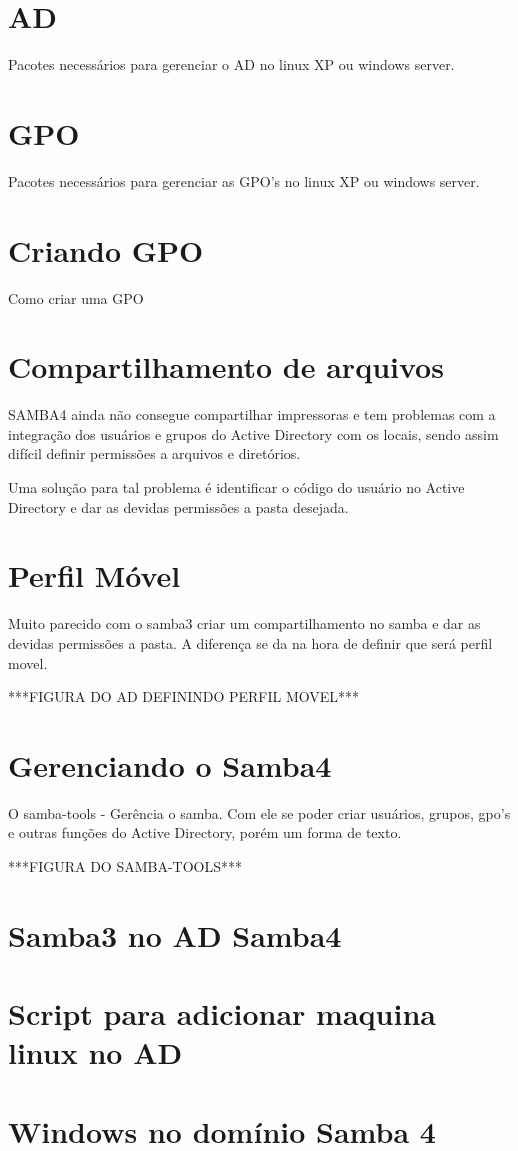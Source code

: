 \section{AD}

Pacotes necessários para gerenciar o AD no linux XP ou windows server.

\section{GPO}

Pacotes necessários para gerenciar as GPO's no linux XP ou windows server.

\section{Criando GPO}

Como criar uma GPO

\section{Compartilhamento de arquivos}

SAMBA4 ainda não consegue compartilhar impressoras e tem problemas com a integração dos usuários e grupos do Active Directory com os locais, sendo assim difícil definir permissões a arquivos e diretórios.

Uma solução para tal problema é identificar o código do usuário no Active Directory e dar as devidas permissões a pasta desejada.

\section{Perfil Móvel}

Muito parecido com o samba3 criar um compartilhamento no samba e dar as devidas permissões a pasta. A diferença se da na hora de definir que será perfil movel.

***FIGURA DO AD DEFININDO PERFIL MOVEL***

\section{Gerenciando o Samba4}

O samba-tools - Gerência o samba. Com ele se poder criar usuários, grupos, gpo's e outras funções do Active Directory, porém um forma de texto.

***FIGURA DO SAMBA-TOOLS***

\section{Samba3 no AD Samba4}

\section{Script para adicionar maquina linux no AD}

\section{Windows no domínio Samba 4}